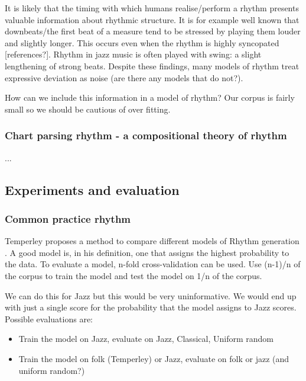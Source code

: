 \documentclass[a4paper,10pt]{article}
\begin{document}

It is likely that the timing with which humans realise/perform a rhythm presents valuable information about rhythmic structure. It is for example well known that downbeats/the first beat of a measure tend to be stressed by playing them louder and slightly longer. This occurs even when the rhythm is highly syncopated [references?]. Rhythm in jazz music is often played with swing: a slight lengthening of strong beats. Despite these findings, many models of rhythm treat expressive deviation as noise (are there any models that do not?). 

How can we include this information in a model of rhythm? Our corpus is fairly small so we should be cautious of over fitting.

\subsubsection*{Chart parsing rhythm - a compositional theory of rhythm}

...

\subsection{Experiments and evaluation}


\subsubsection*{Common practice rhythm}
Temperley proposes a method to compare different models of Rhythm generation \citep{temperley2010modeling}. A good model is, in his definition, one that assigns the highest probability to the data. To evaluate a model, n-fold cross-validation can be used. Use (n-1)/n of the corpus to train the model and test the model on 1/n of the corpus. 

We can do this for Jazz but this would be very uninformative. We would end up with just a single score for the probability that the model assigns to Jazz scores. Possible evaluations are:
\begin{itemize}
\item Train the model on Jazz, evaluate on Jazz, Classical, Uniform random
\item Train the model on folk (Temperley) or Jazz, evaluate on folk or jazz (and uniform random?)
\end{itemize}
\end{document}
